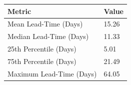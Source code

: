 \begin{tabular}{ll}
\toprule
Metric & Value \\
\midrule
Mean Lead-Time (Days) & 15.26 \\
Median Lead-Time (Days) & 11.33 \\
25th Percentile (Days) & 5.01 \\
75th Percentile (Days) & 21.49 \\
Maximum Lead-Time (Days) & 64.05 \\
\bottomrule
\end{tabular}
